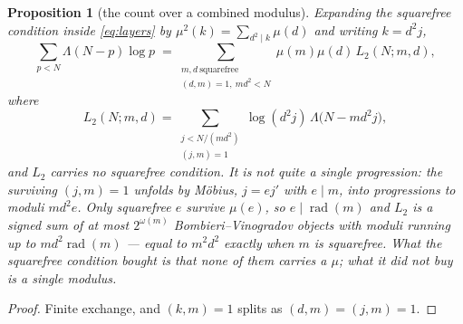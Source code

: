 \documentclass[11pt,a4paper]{article}
\theoremstyle{plain}
\newtheorem{proposition}[theorem]{Proposition}
\theoremstyle{definition}
\theoremstyle{remark}
\DeclareMathOperator{\rad}{rad}
\begin{document}
\begin{proposition}[the count over a combined modulus]%
\label{prop:combined}
Expanding the squarefree condition inside \eqref{eq:layers} by
$\mu^2(k)=\sum_{d^2\mid k}\mu(d)$ and writing $k=d^2j$,
\begin{equation}\label{eq:combined}
  \sum_{p<N}\Lambda(N-p)\log p
   \;=\!\!\sum_{\substack{m,d\ \text{squarefree}\\ (d,m)=1,\ md^2<N}}\!\!
     \mu(m)\mu(d)\,L_2(N;m,d),
\end{equation}
where
\[
  L_2(N;m,d)=\!\!\sum_{\substack{j<N/(md^2)\\ (j,m)=1}}\!\!
   \log(d^2j)\,\Lambda\bigl(N-md^2j\bigr),
\]
and $L_2$ carries no squarefree condition. It is not quite a single
progression: the surviving $(j,m)=1$ unfolds by M\"obius, $j=ej'$ with
$e\mid m$, into progressions to moduli $md^2e$. Only squarefree $e$
survive $\mu(e)$, so $e\mid\rad(m)$ and $L_2$ is a signed sum of at
most $2^{\omega(m)}$ Bombieri--Vinogradov objects with moduli running
up to $md^2\rad(m)$ --- equal to $m^2d^2$ exactly when $m$ is
squarefree. What the squarefree condition bought is that none of them
carries a $\mu$; what it did not buy is a single modulus.
\end{proposition}

\begin{proof}
Finite exchange, and $(k,m)=1$ splits as $(d,m)=(j,m)=1$.
\end{proof}
\end{document}
